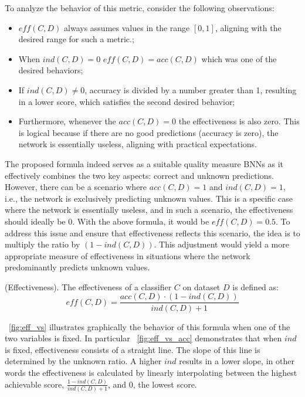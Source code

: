 To analyze the behavior of this metric, consider the following observations:
\begin{itemize}
	\item $eff(C,D)$ always assumes values in the range $[0,1]$, aligning with the desired range for such a metric.;
	\item When $ind(C,D)=0$ $eff(C,D) = acc(C,D)$ which was one of the desired behaviors;
	\item If $ind(C,D) \ne 0$, accuracy is divided by a number greater than 1, resulting in a lower score, which satisfies the second desired behavior;
	\item Furthermore, whenever the $acc(C,D) = 0$ the effectiveness is also zero. This is logical because if there are no good predictions (accuracy is zero), the network is essentially useless, aligning with practical expectations.
\end{itemize}

The proposed formula indeed serves as a suitable quality measure BNNs as it effectively combines the two key aspects: correct and unknown predictions.
However, there can be a scenario where $acc(C,D)=1$ and $ind(C,D)=1$, i.e., the network is exclusively predicting unknown values. This is a specific case where the network is essentially useless, and in such a scenario, the effectiveness should ideally be 0. With the above formula, it would be $eff(C,D)=0.5$.
To address this issue and ensure that effectiveness reflects this scenario, the idea is to multiply the ratio by $(1-ind(C,D))$. This adjustment would yield a more appropriate measure of effectiveness in situations where the network predominantly predicts unknown values.

\begin{definition} (Effectiveness).
	The effectiveness of a classifier $C$ on dataset $D$ is defined as:
	\[
		eff(C,D) = \frac{acc(C,D) \cdot (1 - ind(C,D))}{ind(C,D) + 1}
	\]
\end{definition}

\Fig~\ref{fig:eff_vs} illustrates graphically the behavior of this formula when one of the two variables is fixed. In particular \Fig~\ref{fig:eff_vs_acc} demonstrates that when $ind$ is fixed, effectiveness consists of a straight line. The slope of this line is determined by the unknown ratio. A higher $ind$ results in a lower slope, in other words the effectiveness is calculated by linearly interpolating between the highest achievable score, $\frac{1 - ind(C,D)}{ind(C,D) + 1}$, and $0$, the lowest score.

